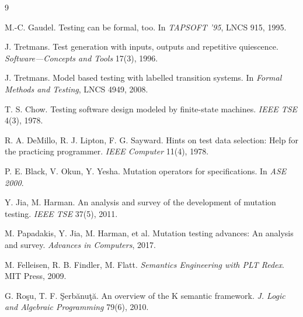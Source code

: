 \documentclass[sigplan,screen,review,nonacm]{acmart}
\begin{document}
\begin{thebibliography}{9}

M.-C. Gaudel.
\newblock Testing can be formal, too.
\newblock In \emph{TAPSOFT '95}, LNCS 915, 1995.

J. Tretmans.
\newblock Test generation with inputs, outputs and repetitive quiescence.
\newblock \emph{Software---Concepts and Tools} 17(3), 1996.

J. Tretmans.
\newblock Model based testing with labelled transition systems.
\newblock In \emph{Formal Methods and Testing}, LNCS 4949, 2008.

T. S. Chow.
\newblock Testing software design modeled by finite-state machines.
\newblock \emph{IEEE TSE} 4(3), 1978.

R. A. DeMillo, R. J. Lipton, F. G. Sayward.
\newblock Hints on test data selection: Help for the practicing programmer.
\newblock \emph{IEEE Computer} 11(4), 1978.

P. E. Black, V. Okun, Y. Yesha.
\newblock Mutation operators for specifications.
\newblock In \emph{ASE 2000}.

Y. Jia, M. Harman.
\newblock An analysis and survey of the development of mutation testing.
\newblock \emph{IEEE TSE} 37(5), 2011.

M. Papadakis, Y. Jia, M. Harman, et al.
\newblock Mutation testing advances: An analysis and survey.
\newblock \emph{Advances in Computers}, 2017.

M. Felleisen, R. B. Findler, M. Flatt.
\newblock \emph{Semantics Engineering with PLT Redex}.
\newblock MIT Press, 2009.

G. Ro\c{s}u, T. F. \c{S}erb\u{a}nu\c{t}\u{a}.
\newblock An overview of the K semantic framework.
\newblock \emph{J. Logic and Algebraic Programming} 79(6), 2010.

\end{thebibliography}
\end{document}
